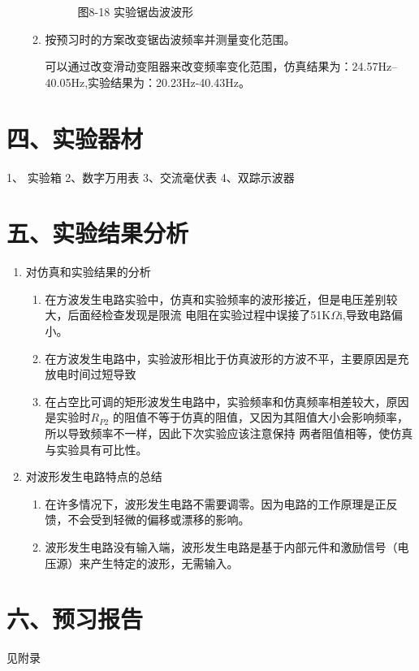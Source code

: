 \documentclass[a4paper,10pt,notitlepage]{article}
\begin{document}
\begin{enumerate}
\begin{enumerate}
\begin{figure}
\begin{minipage}{0.3\textwidth}
					\caption*{图8-18 实验锯齿波波形}
				\end{minipage}
			\end{figure}
			\item 按预习时的方案改变锯齿波频率并测量变化范围。\par 
			可以通过改变滑动变阻器来改变频率变化范围，仿真结果为：24.57Hz--40.05Hz,实验结果为：20.23Hz-40.43Hz。
		\end{enumerate}
	\end{enumerate}
	\newpage
	\section*{四、实验器材}
	1、 实验箱 2、数字万用表 3、交流毫伏表 4、双踪示波器
	\section*{五、实验结果分析}
	\begin{enumerate}
		\item 对仿真和实验结果的分析
		\begin{enumerate}
			\item 在方波发生电路实验中，仿真和实验频率的波形接近，但是电压差别较大，后面经检查发现是限流
			电阻在实验过程中误接了51K$\Omega$i,导致电路偏小。
			\item 在方波发生电路中，实验波形相比于仿真波形的方波不平，主要原因是充放电时间过短导致
			\item 在占空比可调的矩形波发生电路中，实验频率和仿真频率相差较大，原因是实验时$R_{P2}$
			的阻值不等于仿真的阻值，又因为其阻值大小会影响频率，所以导致频率不一样，因此下次实验应该注意保持
			两者阻值相等，使仿真与实验具有可比性。
		\end{enumerate}
		\item 对波形发生电路特点的总结
		\begin{enumerate}
			\item 在许多情况下，波形发生电路不需要调零。因为电路的工作原理是正反馈，不会受到轻微的偏移或漂移的影响。
			\item 波形发生电路没有输入端，波形发生电路是基于内部元件和激励信号（电压源）来产生特定的波形，无需输入。
		\end{enumerate}
	\end{enumerate}
	\section*{六、预习报告}
	见附录
\end{document}
